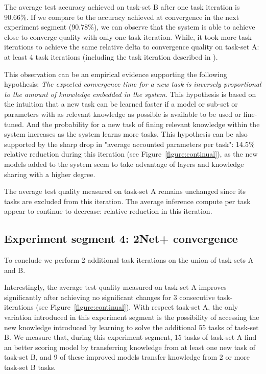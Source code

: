 \documentclass{article} \usepackage{iclr2023_conference,times}
\begin{document}
The average test accuracy achieved on task-set B after one task iteration is 90.66\%.
If we compare to the accuracy achieved at convergence in the next experiment segment (90.78\%), we can observe that the system is able to achieve close to converge quality with only 
one task iteration.
While, it took more task iterations to achieve the same relative delta to convergence quality on task-set A: at least 4 task iterations (including the task iteration described in \cite{Gesmundo2022munet2}).

This observation can be an empirical evidence supporting the following hypothesis: \emph{The expected convergence time for a new task is inversely proportional to the amount of knowledge embedded in the system}.
This hypothesis is based on the intuition that a new task can be learned faster if a model or sub-set or parameters with as relevant knowledge as possible is available to be used or fine-tuned.
And the probability for a new task of fining relevant knowledge within the system increases as the system learns more tasks.
This hypothesis can be also supported by the sharp drop in "average accounted parameters per task": 14.5\% relative reduction during this iteration (see Figure~\ref{figure:continual}), as the new models added to the system seem to take advantage of layers and knowledge sharing with a higher degree.

The average test quality measured on task-set A remains unchanged since its tasks are excluded from this iteration.
The average inference compute per task appear to continue to decrease:  relative reduction in this iteration.

\subsection{Experiment segment 4: 2Net+ convergence}

To conclude we perform 2 additional task iterations on the union of task-sets A and B.

Interestingly, the average test quality measured on task-set A improves significantly after achieving no significant changes for 3 consecutive task-iterations (see Figure~\ref{figure:continual}).
With respect task-set A, the only variation introduced in this experiment segment is the possibility of accessing the new knowledge introduced by learning to solve the additional 55 tasks of task-set B.
We measure that, during this experiment segment, 15 tasks of task-set A find an better scoring model by transferring knowledge from at least one new task of task-set B, and 9
of these improved models transfer knowledge from 2 or more task-set B tasks.
\end{document}
